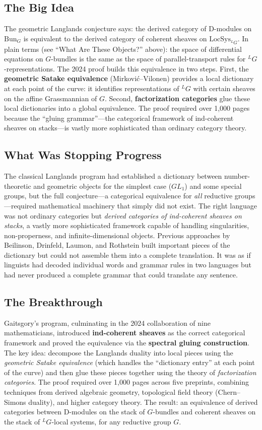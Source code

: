 \subsection{The Big Idea}
The geometric Langlands conjecture says: the derived category of D-modules on $\mathrm{Bun}_G$ is equivalent to the derived category of coherent sheaves on $\mathrm{LocSys}_{^LG}$. In plain terms (see ``What Are These Objects?'' above): the space of differential equations on $G$-bundles is the same as the space of parallel-transport rules for ${}^LG$-representations. The 2024 proof builds this equivalence in two steps. First, the \textbf{geometric Satake equivalence} (Mirkovi\'c--Vilonen) provides a local dictionary at each point of the curve: it identifies representations of ${}^LG$ with certain sheaves on the affine Grassmannian of $G$. Second, \textbf{factorization categories} glue these local dictionaries into a global equivalence. The proof required over 1,000 pages because the ``gluing grammar''---the categorical framework of ind-coherent sheaves on stacks---is vastly more sophisticated than ordinary category theory.

\subsection{What Was Stopping Progress}
The classical Langlands program had established a dictionary between number-theoretic and geometric objects for the simplest case ($GL_1$) and some special groups, but the full conjecture---a categorical equivalence for \emph{all} reductive groups---required mathematical machinery that simply did not exist. The right language was not ordinary categories but \emph{derived categories of ind-coherent sheaves on stacks}, a vastly more sophisticated framework capable of handling singularities, non-properness, and infinite-dimensional objects. Previous approaches by Beilinson, Drinfeld, Laumon, and Rothstein built important pieces of the dictionary but could not assemble them into a complete translation. It was as if linguists had decoded individual words and grammar rules in two languages but had never produced a complete grammar that could translate any sentence.

\subsection{The Breakthrough}
Gaitsgory's program, culminating in the 2024 collaboration of nine mathematicians, introduced \textbf{ind-coherent sheaves} as the correct categorical framework and proved the equivalence via the \textbf{spectral gluing construction}. The key idea: decompose the Langlands duality into local pieces using the \emph{geometric Satake equivalence} (which handles the ``dictionary entry'' at each point of the curve) and then glue these pieces together using the theory of \emph{factorization categories}. The proof required over 1,000 pages across five preprints, combining techniques from derived algebraic geometry, topological field theory (Chern--Simons duality), and higher category theory. The result: an equivalence of derived categories between D-modules on the stack of $G$-bundles and coherent sheaves on the stack of ${}^L\!G$-local systems, for any reductive group $G$.

